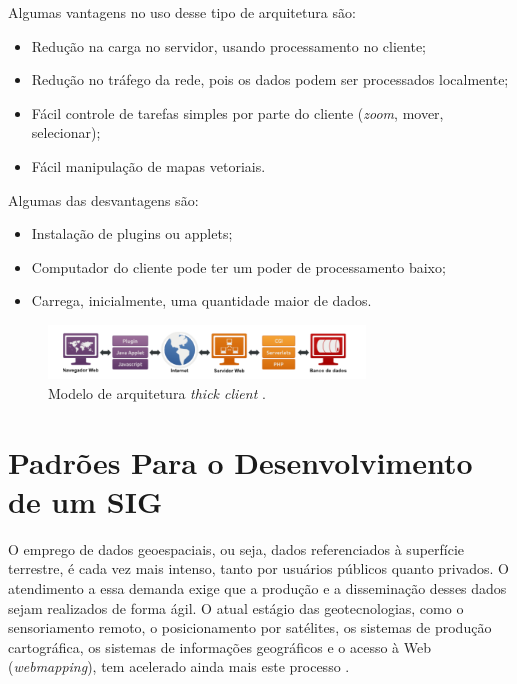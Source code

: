 Algumas vantagens no uso desse tipo de arquitetura são:

\begin{itemize}
\item Redução na carga no servidor, usando processamento no cliente;
\item Redução no tráfego da rede, pois os dados podem ser processados localmente;
\item Fácil controle de tarefas simples por parte do cliente (\textit{zoom}, mover, selecionar);
\item Fácil manipulação de mapas vetoriais.
\end{itemize}

Algumas das desvantagens são:

\begin{itemize}
\item Instalação de plugins ou applets;
\item Computador do cliente pode ter um poder de processamento baixo;
\item Carrega, inicialmente, uma quantidade maior de dados.
\end{itemize}

\begin{figure}[h]
\centering
\includegraphics[width=0.75\textwidth]{./img/cap_III/6-ArquiteturaThickClient}
\caption{Modelo de arquitetura \textit{thick client} \cite{websisbra}.}
\label{fig:ArquiteturaThickClient}
\end{figure}

\section{Padrões Para o Desenvolvimento de um SIG}

O emprego de dados geoespaciais, ou seja, dados referenciados à superfície terrestre, é cada vez mais intenso, tanto por usuários públicos quanto privados. O atendimento a essa demanda exige que a produção e a disseminação desses dados sejam realizados de forma ágil. O atual estágio das geotecnologias, como o sensoriamento remoto, o posicionamento por satélites, os sistemas de produção cartográfica, os sistemas de informações geográficos e o acesso à Web (\textit{webmapping}), tem acelerado ainda mais este processo \cite{concar}.

